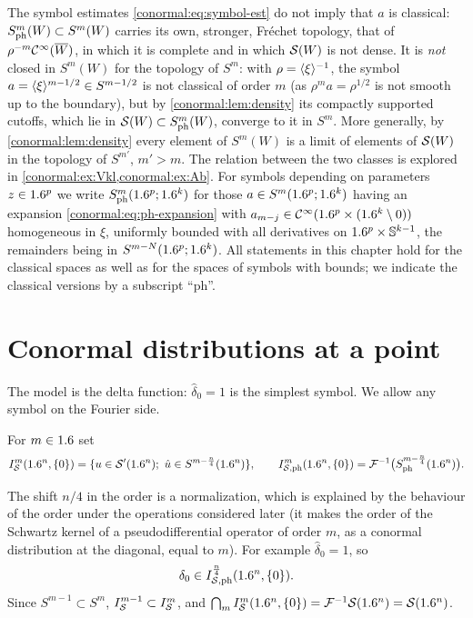 The symbol estimates \eqref{conormal:eq:symbol-est} do not imply that $a$ is
classical: $S^{m}_{\mathrm{ph}}(W)\subset S^m(W)$ carries its own, stronger, Fréchet
topology, that of $\rho^{-m}\mathcal{C}^\infty(\overline{W})$, in which it is complete and in
which $\mathcal{S}(W)$ is not dense. It is \emph{not} closed in $S^m(W)$ for the
topology of $S^m$: with $\rho=\langle \xi\rangle^{-1}$, the symbol
$a=\langle \xi\rangle^{m-1/2}\in S^{m-1/2}$ is not classical of order $m$ (as
$\rho^ma=\rho^{1/2}$ is not smooth up to the boundary), but by
\cref{conormal:lem:density} its compactly supported cutoffs, which lie in
$\mathcal{S}(W)\subset S^{m}_{\mathrm{ph}}(W)$, converge to it in $S^m$. More generally, by
\cref{conormal:lem:density} every element of $S^m(W)$ is a limit of elements
of $\mathcal{S}(W)$ in the topology of $S^{m'}$, $m'>m$.  The relation between the two classes is explored in
\cref{conormal:ex:Vkl,conormal:ex:Ab}.  For symbols depending on parameters
$z\in1.6^p$ we write $S^{m}_{\mathrm{ph}}(1.6^p;1.6^k)$ for those $a\in S^m(1.6^p;1.6^k)$
having an expansion \eqref{conormal:eq:ph-expansion} with
$a_{m-j}\in\mathcal{C}^\infty(1.6^p\times(1.6^k\setminus0))$ homogeneous in $\xi$, uniformly
bounded with all derivatives on $1.6^p\times\mathbb{S}^{k-1}$, the remainders being
in $S^{m-N}(1.6^p;1.6^k)$.  All statements in this chapter hold for the classical
spaces as well as for the spaces of symbols with bounds; we indicate the
classical versions by a subscript ``$\mathrm{ph}$''.

\section{Conormal distributions at a point}\label{conormal:sec:point}

The model is the delta function: $\hat\delta_0=1$ is the simplest symbol. We
allow any symbol on the Fourier side.

\begin{definition}\label{conormal:def:point}
  For $m\in1.6$ set
  \begin{equation*}
    I^{m}_{\mathcal{S}}(1.6^n,\{0\})=\{u\in\mathcal{S}'(1.6^n);\ \hat u\in S^{m-\frac n4}(1.6^n)\},
    \qquad
    I^{m}_{\mathcal{S},\mathrm{ph}}(1.6^n,\{0\})=\mathcal{F}^{-1}\big(S^{m-\frac n4}_{\mathrm{ph}}(1.6^n)\big).
  \end{equation*}
\end{definition}

The shift $n/4$ in the order is a normalization, which is explained by the
behaviour of the order under the operations considered later (it makes the
order of the Schwartz kernel of a pseudodifferential operator of order $m$, as
a conormal distribution at the diagonal, equal to $m$).  For example
$\hat\delta_0=1$, so
\begin{equation*}
  \delta_0\in I^{\frac n4}_{\mathcal{S},\mathrm{ph}}(1.6^n,\{0\}).
\end{equation*}
Since $S^{m-1}\subset S^m$, $I^{m-1}_{\mathcal{S}}\subset I^{m}_{\mathcal{S}}$, and
$\bigcap_mI^{m}_{\mathcal{S}}(1.6^n,\{0\})=\mathcal{F}^{-1}\mathcal{S}(1.6^n)=\mathcal{S}(1.6^n)$.

